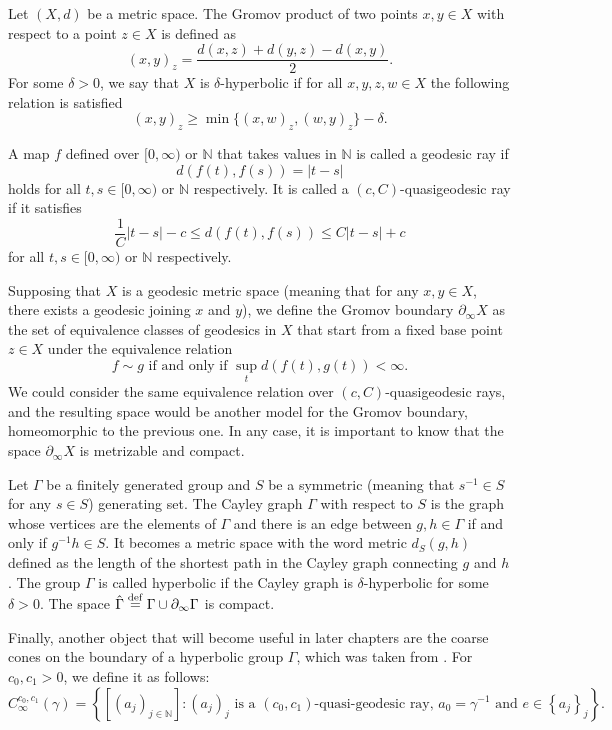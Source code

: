 \documentclass{report}
\begin{document}
Let $(X, d)$ be a metric space.
The Gromov product of two points $x, y \in X$ with respect to a point $z \in X$ is defined as
\[
(x, y)_z = \frac{d(x,z) + d(y,z) - d(x,y)}{2}.
\]
For some $\delta > 0$, we say that $X$ is $\delta$-hyperbolic if for all $x,y,z,w \in X$ the following relation is satisfied
\[
(x, y)_z \geq \min \{ (x, w)_z, (w, y)_z \} - \delta.
\]

A map $f$ defined over $[0, \infty)$ or $\mathbb N$ that takes values in $\mathbb N$ is called a geodesic ray if 
$$d(f(t), f(s)) = |t-s|$$
 holds for all $t, s \in \mathbb [0, \infty)$ or $\mathbb N$ respectively.
It is called a $(c, C)$-quasigeodesic ray if it satisfies 
$$\frac{1}{C}|t-s| - c \leq d(f(t), f(s)) \leq C|t-s| + c$$
for all $t, s \in \mathbb [0, \infty)$ or $\mathbb N$ respectively.

Supposing that $X$ is a geodesic metric space (meaning that for any $x,y \in X$, there exists a geodesic joining $x$ and $y$), we define the Gromov boundary $\partial_\infty X$ as the set of equivalence classes of geodesics in $X$ that start from a fixed base point $z \in X$ under the equivalence relation
\[
f \sim g \text{ if and only if } \sup_t d(f(t), g(t)) < \infty.
\]
We could consider the same equivalence relation over $(c,C)$-quasigeodesic rays, and the resulting space would be another model for the Gromov boundary, homeomorphic to the previous one. 
In any case, it is important to know that the space $\partial_\infty X$ is metrizable and compact.

Let $\Gamma$ be a finitely generated group and $S$ be a symmetric (meaning that $s^{-1} \in S$ for any $s \in S$) generating set.
The Cayley graph $\Gamma$ with respect to $S$ is the graph whose vertices are the elements of $\Gamma$ and there is an edge between $g, h \in \Gamma$ if and only if $g^{-1}h \in S$.
It becomes a metric space with the word metric $d_S(g,h)$ defined as the length of the shortest path in the Cayley graph connecting $g$ and $h$.
The group $\Gamma$ is called hyperbolic if the Cayley graph is $\delta$-hyperbolic for some $\delta > 0$.
The space $\hat \Gamma \overset{\mathrm{def}}{=} \Gamma \cup \partial_\infty \Gamma$ is compact.

Finally, another object that will become useful in later chapters are the coarse cones on the boundary of a hyperbolic group $\Gamma$, which was taken from \cite{pozzetti_anosov_2023}.
For $c_0, c_1 > 0$, we define it as follows:
\[
C_{\infty}^{c_0, c_1}(\gamma) = \left\{ [(a_j)_{j \in \mathbb N}] : (a_j)_j \text{ is a } (c_0,c_1)\text{-quasi-geodesic ray, } a_0 = \gamma^{-1} \text{ and } e \in \left\{ a_j \right\}_{j} \right\}.
\]
\end{document}
